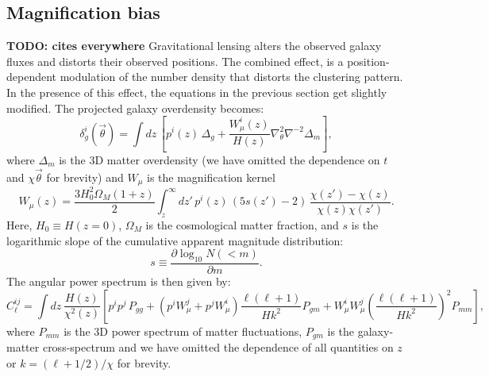 \documentclass[a4paper,11pt]{article}
\newcommand{\nv}{\vec{\theta}}
\newcommand{\todo}[1]{{\bf TODO: #1}}
\begin{document}
  \subsection{Magnification bias}\label{ssec:theory.mag}
    \todo{cites everywhere}
    Gravitational lensing alters the observed galaxy fluxes and distorts their observed positions. The combined effect, is a position-dependent modulation of the number density that distorts the clustering pattern.
    In the presence of this effect, the equations in the previous section get slightly modified. The projected galaxy overdensity becomes:
    \begin{equation}
      \delta^i_g(\nv)=\int dz\,\left[p^i(z)\,\Delta_g+\frac{W_\mu^i(z)}{H(z)}\nabla_\theta^2\nabla^{-2}\Delta_m\right],
    \end{equation}
    where $\Delta_m$ is the 3D matter overdensity (we have omitted the dependence on $t$ and $\chi\nv$ for brevity) and $W_\mu$ is the magnification kernel
    \begin{equation}
      W_\mu(z)=\frac{3H_0^2\Omega_M(1+z)}{2}\int_z^\infty dz'\,p^i(z)\,\left(5s(z')-2\right)\,\frac{\chi(z')-\chi(z)}{\chi(z)\chi(z')}.
    \end{equation}
    Here, $H_0\equiv H(z=0)$, $\Omega_M$ is the cosmological matter fraction, and $s$ is the logarithmic slope of the cumulative apparent magnitude distribution:
    \begin{equation}
      s\equiv\frac{\partial \log_{10}N(<m)}{\partial m}.
    \end{equation}
    The angular power spectrum is then given by:
    \begin{equation}
      C^{ij}_\ell = \int dz\,\frac{H(z)}{\chi^2(z)}\left[p^ip^j\,P_{gg}+\left(p^iW_\mu^j+p^jW_\mu^i\right)\frac{\ell(\ell+1)}{Hk^2}P_{gm}+W_\mu^iW_\mu^j\left(\frac{\ell(\ell+1)}{Hk^2}\right)^2P_{mm}\right],
    \end{equation}
    where $P_{mm}$ is the 3D power spectrum of matter fluctuations, $P_{gm}$ is the galaxy-matter cross-spectrum and we have omitted the dependence of all quantities on $z$ or $k=(\ell+1/2)/\chi$ for brevity.
\end{document}
